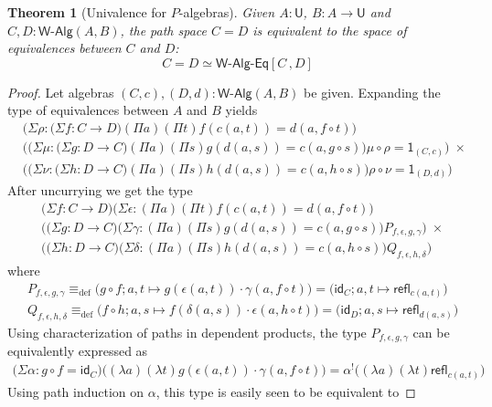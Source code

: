\documentclass[reqno,10pt,a4paper,oneside]{amsart}
\numberwithin{equation}{section}
\theoremstyle{mythm}
\newtheorem{theorem}{Theorem}[subsection]
\theoremstyle{mydef}
\theoremstyle{myrmk}
\newcommand{\deq}{\equiv}
\newcommand{\defeq}{\deq_{\mathrm{def}}}
\newcommand{\idfun}[1]{\mathsf{id}_{#1}}
\newcommand{\comp}{\circ}
\newcommand{\ct}{\cdot}
\newcommand{\refl}{\mathsf{refl}}
\newcommand{\one}{\mathsf{1}}
\newcommand{\UU}{\mathsf{U}}
\newcommand{\WAlg}{\mathsf{W}\text{-}\mathsf{Alg}}
\newcommand{\WAlgIso}{\mathsf{W}\text{-}\mathsf{Alg}\text{-}\mathsf{Eq}}
\begin{document}
\begin{theorem}[Univalence for $P$-algebras] \label{WAlgSpace}
Given $A:\UU$, $B : A \to \UU$ and $C,D  : \WAlg(A,B)$, the path space $C = D$ is equivalent to the space of equivalences between $C$ and $D$:
\[ C = D  \simeq  \WAlgIso[C \, , D] \] 
\end{theorem}
\begin{proof}
Let algebras $(C,c), (D,d) : \WAlg(A,B)$ be given. Expanding the type of equivalences between $A$ and $B$ yields
\begin{align*}
& \big(\Sigma \rho : \big(\Sigma f:C\to D\big) (\Pi a)(\Pi t) f(c(a,t)) = d(a,f \comp t)\big) \\ 
& \Big(\big(\Sigma \mu : \big(\Sigma g:D\to C \big) (\Pi a)(\Pi s) g(d(a,s)) = c(a,g \comp s)\big) \mu \comp \rho = \one_{(C,c)} \Big) \; \times \\
& \Big(\big(\Sigma \nu : \big(\Sigma h:D\to C \big) (\Pi a)(\Pi s) h(d(a,s)) = c(a,h\comp s) \big) \rho \comp \nu = \one_{(D,d)} \Big)
\end{align*}
After uncurrying we get the type
\begin{align*}
& \big(\Sigma f:C\to D\big) \big(\Sigma \epsilon : (\Pi a)(\Pi t) f(c(a,t)) = d(a,f \comp t)\big) \\ 
& \Big(\big(\Sigma g:D\to C \big) \big(\Sigma \gamma : (\Pi a)(\Pi s) g(d(a,s)) = c(a,g \comp s)\big) P_{f,\epsilon,g,\gamma} \Big) \; \times \\
& \Big(\big(\Sigma h:D\to C \big) \big(\Sigma \delta : (\Pi a)(\Pi s) h(d(a,s)) = c(a,h\comp s) \big) Q_{f,\epsilon,h,\delta} \Big)
\end{align*}
where
\begin{align*}
& P_{f,\epsilon,g,\gamma} \defeq \Big(g \comp f; a,t \mapsto g(\epsilon(a,t)) \ct \gamma(a, f \comp t)\Big) = \Big(\idfun{C}; a,t \mapsto \refl_{c(a,t)}\Big) \\
& Q_{f,\epsilon,h,\delta} \defeq \Big(f \comp h; a,s \mapsto f(\delta(a,s)) \ct \epsilon(a, h \comp t)\Big) = \Big(\idfun{D}; a,s \mapsto \refl_{d(a,s)}\Big)
\end{align*}
Using characterization of paths in dependent products, the type $P_{f,\epsilon,g,\gamma}$ can be equivalently expressed as
\begin{align*}
\big(\Sigma \alpha : g \comp f = \idfun{C} \big) \Big((\lambda a) (\lambda t) g(\epsilon(a,t)) \ct \gamma(a, f \comp t)\Big) = \alpha^{!} \Big((\lambda a) (\lambda t) \refl_{c(a,t)}\Big) 
\end{align*}
Using path induction on $\alpha$, this type is easily seen to be equivalent to

\end{proof}
\end{document}
